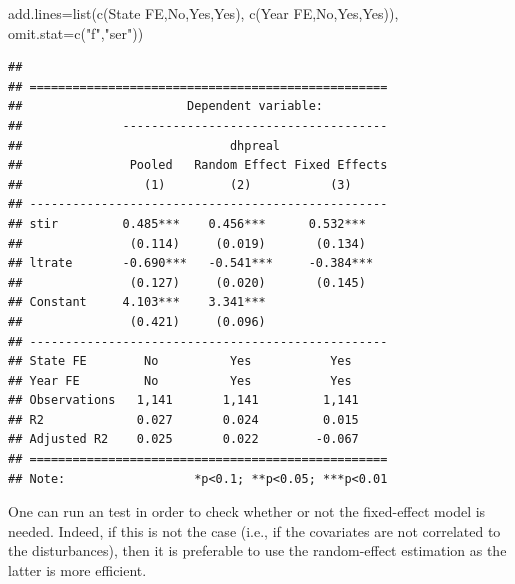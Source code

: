 \documentclass[
  12pt,
]{book}
\newenvironment{Shaded}{\begin{snugshade}}{\end{snugshade}}
\newcommand{\AttributeTok}[1]{\textcolor[rgb]{0.77,0.63,0.00}{#1}}
\newcommand{\FunctionTok}[1]{\textcolor[rgb]{0.00,0.00,0.00}{#1}}
\newcommand{\NormalTok}[1]{#1}
\newcommand{\StringTok}[1]{\textcolor[rgb]{0.31,0.60,0.02}{#1}}
\theoremstyle{definition}
\theoremstyle{definition}
\theoremstyle{definition}
\theoremstyle{definition}
\theoremstyle{remark}
\begin{document}
\begin{Shaded}
\begin{Highlighting}[]
                     \AttributeTok{add.lines=}\FunctionTok{list}\NormalTok{(}\FunctionTok{c}\NormalTok{(}\StringTok{\textquotesingle{}State FE\textquotesingle{}}\NormalTok{,}\StringTok{\textquotesingle{}No\textquotesingle{}}\NormalTok{,}\StringTok{\textquotesingle{}Yes\textquotesingle{}}\NormalTok{,}\StringTok{\textquotesingle{}Yes\textquotesingle{}}\NormalTok{),}
                                    \FunctionTok{c}\NormalTok{(}\StringTok{\textquotesingle{}Year FE\textquotesingle{}}\NormalTok{,}\StringTok{\textquotesingle{}No\textquotesingle{}}\NormalTok{,}\StringTok{\textquotesingle{}Yes\textquotesingle{}}\NormalTok{,}\StringTok{\textquotesingle{}Yes\textquotesingle{}}\NormalTok{)),}
                     \AttributeTok{omit.stat=}\FunctionTok{c}\NormalTok{(}\StringTok{"f"}\NormalTok{,}\StringTok{"ser"}\NormalTok{))}
\end{Highlighting}
\end{Shaded}

\begin{verbatim}
## 
## ==================================================
##                       Dependent variable:         
##              -------------------------------------
##                             dhpreal               
##               Pooled   Random Effect Fixed Effects
##                 (1)         (2)           (3)     
## --------------------------------------------------
## stir         0.485***    0.456***      0.532***   
##               (0.114)     (0.019)       (0.134)   
## ltrate       -0.690***   -0.541***     -0.384***  
##               (0.127)     (0.020)       (0.145)   
## Constant     4.103***    3.341***                 
##               (0.421)     (0.096)                 
## --------------------------------------------------
## State FE        No          Yes           Yes     
## Year FE         No          Yes           Yes     
## Observations   1,141       1,141         1,141    
## R2             0.027       0.024         0.015    
## Adjusted R2    0.025       0.022        -0.067    
## ==================================================
## Note:                  *p<0.1; **p<0.05; ***p<0.01
\end{verbatim}

One can run an \citet{Hausman_1978} test in order to check whether or not the fixed-effect model is needed. Indeed, if this is not the case (i.e., if the covariates are not correlated to the disturbances), then it is preferable to use the random-effect estimation as the latter is more efficient.
\end{document}
